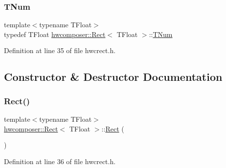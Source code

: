 \subsubsection{\texorpdfstring{T\+Num}{TNum}}
{\footnotesize\ttfamily template$<$typename T\+Float$>$ \\
typedef T\+Float \mbox{\hyperlink{structhwcomposer_1_1Rect}{hwcomposer\+::\+Rect}}$<$ T\+Float $>$\+::\mbox{\hyperlink{structhwcomposer_1_1Rect_a2213394736c5d22a67a543d8aba355e6}{T\+Num}}}



Definition at line 35 of file hwcrect.\+h.



\subsection{Constructor \& Destructor Documentation}
\mbox{\label{structhwcomposer_1_1Rect_adbce36e618da93c3c776d1032b5e16fe}} 
\subsubsection{\texorpdfstring{Rect()}{Rect()}\hspace{0.1cm}{\footnotesize\ttfamily [1/3]}}
{\footnotesize\ttfamily template$<$typename T\+Float$>$ \\
\mbox{\hyperlink{structhwcomposer_1_1Rect}{hwcomposer\+::\+Rect}}$<$ T\+Float $>$\+::\mbox{\hyperlink{structhwcomposer_1_1Rect}{Rect}} (\begin{DoxyParamCaption}{ }\end{DoxyParamCaption})\hspace{0.3cm}{\ttfamily [inline]}}



Definition at line 36 of file hwcrect.\+h.


\begin{DoxyCode}{0}
\end{DoxyCode}
\mbox{\label{structhwcomposer_1_1Rect_ad7670c06999770001be36a8160642849}} 
